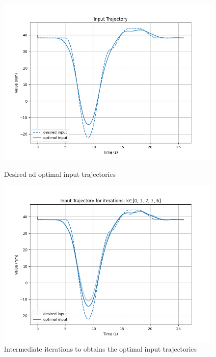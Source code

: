\documentclass[a4paper,11pt,oneside]{book}
\begin{document}
\begin{figure}[ht]
    \begin{minipage}[t]{0.48\textwidth}
        \centering
        \includegraphics[width=\textwidth]{Input_Trajectory_T2.png}
        \caption{Desired ad optimal input trajectories}
        \label{fig:sinistra}
    \end{minipage}
    \hfill
    \begin{minipage}[t]{0.48\textwidth}
        \centering
        \includegraphics[width=\textwidth]{Input_Trajectory_for_iterations_T2.png}
        \caption{Intermediate iterations to obtains the optimal input trajectories}
        \label{fig:destra}
    \end{minipage}
\end{figure}
\end{document}
